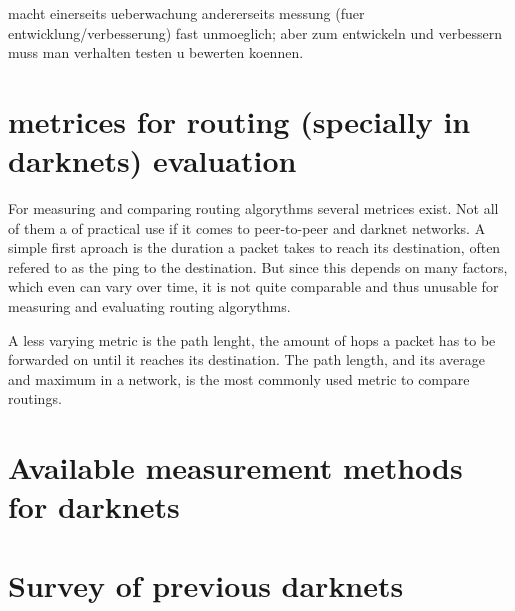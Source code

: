 macht einerseits ueberwachung andererseits messung (fuer entwicklung/verbesserung) fast unmoeglich; aber zum entwickeln und verbessern muss man verhalten testen u bewerten koennen.

\section{metrices for routing (specially in darknets) evaluation}

For measuring and comparing routing algorythms several metrices exist. Not all of them a of practical use if it comes to peer-to-peer and darknet networks. A simple first aproach  is the duration a packet takes to reach its destination, often refered to as the ping to the destination. But since this depends on many factors, which even can vary over time, it is not quite comparable and thus unusable for measuring and evaluating routing algorythms.

A less varying metric is the path lenght, the amount of hops a packet has to be forwarded on until it reaches its destination. The path length, and its average and maximum in a network, is the most commonly used metric to compare routings.



\section{Available measurement methods for darknets}


\section{Survey of previous darknets}


